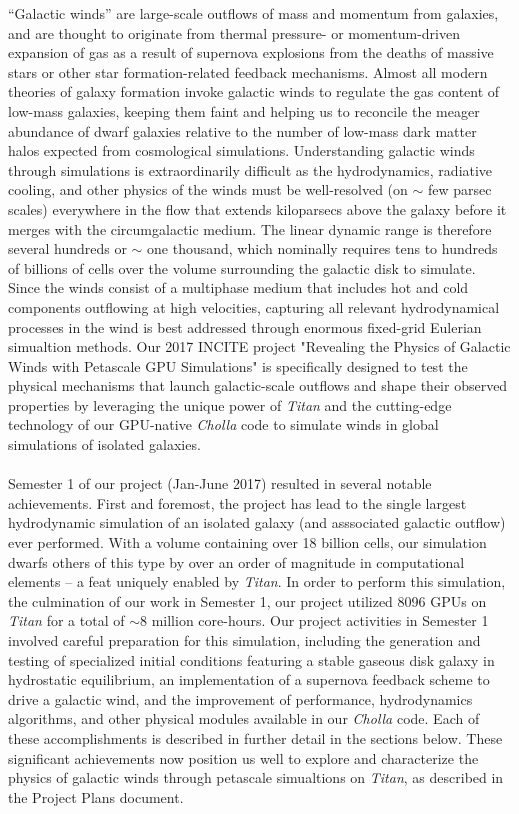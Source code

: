 \documentclass[11pt,letterpaper,english]{article}
\begin{document}
``Galactic winds'' are large-scale outflows of mass and momentum from galaxies, and are thought to originate from thermal pressure- or momentum-driven expansion of gas as a result of supernova explosions
from the deaths of massive stars or other star formation-related feedback mechanisms. Almost all modern
theories of galaxy formation invoke galactic winds to regulate the gas content of low-mass galaxies,
keeping them faint and helping us to reconcile the meager abundance of dwarf galaxies relative to the number of low-mass dark matter halos expected from cosmological simulations. 
Understanding galactic winds through simulations is extraordinarily difficult as the
hydrodynamics, radiative cooling, and other physics of the winds must be well-resolved (on $\sim$ few parsec scales) everywhere in the flow that extends kiloparsecs above the galaxy before it merges with the circumgalactic medium. The linear dynamic range is therefore several hundreds or $\sim$ one thousand, which nominally requires tens to hundreds of billions of cells over the volume surrounding the galactic disk
to simulate. Since the winds consist of a multiphase medium that includes hot and cold components outflowing at high velocities, capturing all relevant hydrodynamical processes in the wind is best addressed through enormous fixed-grid Eulerian simualtion methods.
Our 2017 INCITE project "Revealing the Physics of Galactic Winds with Petascale GPU Simulations" is specifically designed to test the physical mechanisms that launch galactic-scale outflows and shape
their observed properties by leveraging
the unique power of \textit{Titan} and the cutting-edge technology of our GPU-native \textit{Cholla}
code to simulate winds in global simulations of isolated galaxies.
~\\~\\
Semester 1 of our project (Jan-June 2017) resulted in several notable achievements. First and foremost, the project has lead to the single largest hydrodynamic simulation of an isolated galaxy (and asssociated galactic outflow) ever performed. With a volume containing over 18 billion cells, our simulation dwarfs others of this type by over an order of magnitude in computational elements -- a feat uniquely enabled by \textit{Titan}. In order to perform this simulation, the culmination of our work in Semester 1, our project utilized 8096 GPUs on \textit{Titan} for a total of $\sim$8 million core-hours. Our project activities in Semester 1 involved careful preparation for this simulation, including the generation and testing of specialized initial conditions featuring a stable gaseous disk galaxy in hydrostatic equilibrium, an implementation of a supernova feedback scheme to drive a galactic wind, and the improvement of performance,
hydrodynamics algorithms, and other physical modules available in our \textit{Cholla} code. Each of these accomplishments is described in further detail in the sections below. These significant achievements
now position us well to explore and characterize the physics of galactic winds through petascale simualtions
on \textit{Titan}, as described in the Project Plans document.
\end{document}
